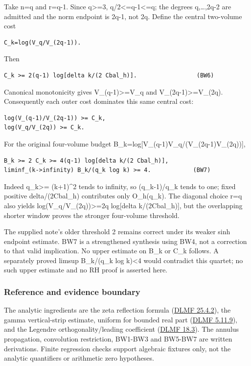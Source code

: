 Take n=q and r=q-1. Since q\textgreater=3, q/2\textless=q-1\textless=q; the degrees q,\ldots,2q-2 are admitted and the norm endpoint is 2q-1, not 2q. Define the central two-volume cost

\begin{verbatim}
C_k=log(V_q/V_(2q-1)).
\end{verbatim}

Then

\begin{verbatim}
C_k >= 2(q-1) log[delta k/(2 Cbal_h)].                 (BW6)
\end{verbatim}

Canonical monotonicity gives V\_(q-1)\textgreater=V\_q and V\_(2q-1)\textgreater=V\_(2q). Consequently each outer cost dominates this same central cost:

\begin{verbatim}
log(V_(q-1)/V_(2q-1)) >= C_k,
log(V_q/V_(2q)) >= C_k.
\end{verbatim}

For the original four-volume budget B\_k=log{[}V\_(q-1)V\_q/(V\_(2q-1)V\_(2q)){]},

\begin{verbatim}
B_k >= 2 C_k >= 4(q-1) log[delta k/(2 Cbal_h)],
liminf_(k->infinity) B_k/(q_k log k) >= 4.            (BW7)
\end{verbatim}

Indeed q\_k\textgreater= (k+1)\^{}2 tends to infinity, so (q\_k-1)/q\_k tends to one; fixed positive delta/(2Cbal\_h) contributes only O\_h(q\_k). The diagonal choice r=q also yields log(V\_q/V\_(2q))\textgreater=2q log{[}delta k/(2Cbal\_h){]}, but the overlapping shorter window proves the stronger four-volume threshold.

The supplied note's older threshold 2 remains correct under its weaker sinh endpoint estimate. BW7 is a strengthened synthesis using BW4, not a correction to that valid implication. No upper estimate on B\_k or C\_k follows. A separately proved limsup B\_k/(q\_k log k)\textless4 would contradict this quartet; no such upper estimate and no RH proof is asserted here.

\subsubsection{Reference and evidence boundary}\label{endpoint-balanced_window--reference-and-evidence-boundary}

The analytic ingredients are the zeta reflection formula (\href{https://dlmf.nist.gov/25.4.E2}{DLMF 25.4.2}), the gamma vertical-strip estimate, uniform for bounded real part (\href{https://dlmf.nist.gov/5.11.E9}{DLMF 5.11.9}), and the Legendre orthogonality/leading coefficient (\href{https://dlmf.nist.gov/18.3}{DLMF 18.3}). The annulus propagation, convolution restriction, BW1-BW3 and BW5-BW7 are written derivations. Finite regression checks support algebraic fixtures only, not the analytic quantifiers or arithmetic zero hypotheses.
